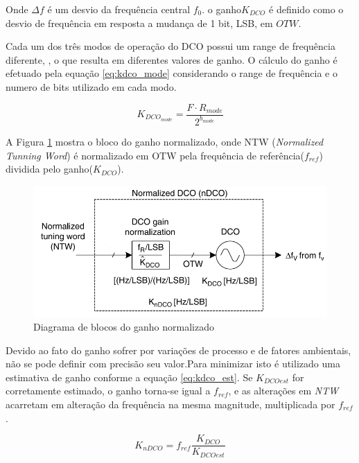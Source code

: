 Onde $\Delta f$ é um desvio da frequência central $f_0$. o ganho$K_{DCO}$ é definido como o desvio de frequência em resposta a mudança de 1 bit, LSB, em $OTW$. 

Cada um dos três modos de operação do DCO possui um range de frequência diferente, , o que resulta em diferentes valores de ganho.  O cálculo do ganho é efetuado pela equação \ref{eq:kdco_mode} considerando o range de frequência e o numero de bits utilizado em cada modo.




\begin{equation}
	K_{DCO_{mode}}= \frac{F \cdot R_{mode}}{2^{b_{mode}}}
	\label{eq:kdco_mode}
\end{equation}

A Figura \ref{fig:ndco} mostra o bloco do ganho normalizado, onde  NTW (\textit{Normalized Tunning Word}) é normalizado em OTW pela frequência de referência($f_{ref}$) dividida pelo ganho($	K_{DCO}$).

\begin{figure}[htb]
	\caption{Diagrama de blocos do ganho normalizado }
	\begin{center}
		\includegraphics[scale=0.7]{img/ndco.png}
	\end{center}
	\label{fig:ndco}
\end{figure}

Devido ao fato do ganho sofrer por variações de processo e de fatores ambientais, não se pode definir com precisão seu valor.Para minimizar isto é utilizado uma estimativa de ganho conforme a equação \ref{eq:kdco_est}. Se  $K_{DCOest}$ for corretamente estimado, o ganho torna-se igual a $f_{ref}$, e as alterações em \textit{NTW} acarretam em alteração da frequência na mesma magnitude, multiplicada por $f_{ref}$.

\begin{equation}
	K_{nDCO}=  f_{ref}\frac{K_{DCO}}{K_{DCOest}}
	\label{eq:kdco_est}
\end{equation}


